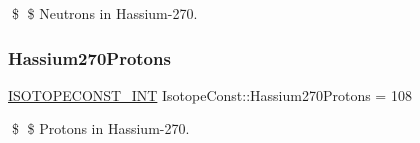 \$ \$ Neutrons in Hassium-\/270. \mbox{\label{group___isotope_const-_hassium-_hs270_gaf85872a9ad83114e563472f8666872b0}} 
\subsubsection{\texorpdfstring{Hassium270\+Protons}{Hassium270Protons}}
{\footnotesize\ttfamily \mbox{\hyperlink{group___isotope_const-_macros_ga5f18360b3e99483a35c32d789e62621c}{I\+S\+O\+T\+O\+P\+E\+C\+O\+N\+S\+T\+\_\+\+I\+NT}} Isotope\+Const\+::\+Hassium270\+Protons = 108}

\$ \$ Protons in Hassium-\/270. 